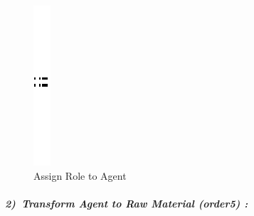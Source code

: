 \vspace{1cm}
\begin{figure}[th]



\centering

\quad{}
\includegraphics{Chapiter3/img/sep}
\quad{}
 
\caption{\label{fig:Create link between Agent and Role}Assign Role to Agent } 
\end{figure}
 

\paragraph{\emph{2)~Transform Agent to Raw Material (order5) :} }
 
